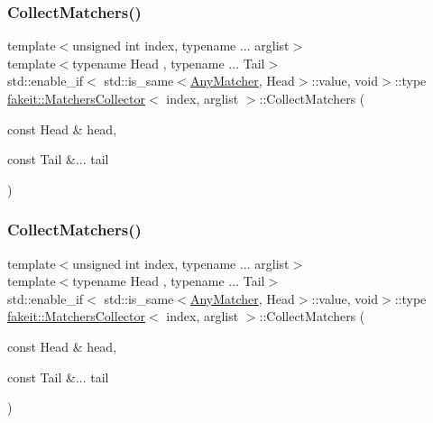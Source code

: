 \mbox{\label{classfakeit_1_1MatchersCollector_a5bc97a3d729b1bb67e372181ad88b77d}} 
\subsubsection{\texorpdfstring{CollectMatchers()}{CollectMatchers()}\hspace{0.1cm}{\footnotesize\ttfamily [51/63]}}
{\footnotesize\ttfamily template$<$unsigned int index, typename ... arglist$>$ \\
template$<$typename Head , typename ... Tail$>$ \\
std\+::enable\+\_\+if$<$ std\+::is\+\_\+same$<$\mbox{\hyperlink{structfakeit_1_1AnyMatcher}{Any\+Matcher}}, Head$>$\+::value, void$>$\+::type \mbox{\hyperlink{classfakeit_1_1MatchersCollector}{fakeit\+::\+Matchers\+Collector}}$<$ index, arglist $>$\+::Collect\+Matchers (\begin{DoxyParamCaption}\item[{const Head \&}]{head,  }\item[{const Tail \&...}]{tail }\end{DoxyParamCaption})\hspace{0.3cm}{\ttfamily [inline]}}

\mbox{\label{classfakeit_1_1MatchersCollector_a5bc97a3d729b1bb67e372181ad88b77d}} 
\subsubsection{\texorpdfstring{CollectMatchers()}{CollectMatchers()}\hspace{0.1cm}{\footnotesize\ttfamily [52/63]}}
{\footnotesize\ttfamily template$<$unsigned int index, typename ... arglist$>$ \\
template$<$typename Head , typename ... Tail$>$ \\
std\+::enable\+\_\+if$<$ std\+::is\+\_\+same$<$\mbox{\hyperlink{structfakeit_1_1AnyMatcher}{Any\+Matcher}}, Head$>$\+::value, void$>$\+::type \mbox{\hyperlink{classfakeit_1_1MatchersCollector}{fakeit\+::\+Matchers\+Collector}}$<$ index, arglist $>$\+::Collect\+Matchers (\begin{DoxyParamCaption}\item[{const Head \&}]{head,  }\item[{const Tail \&...}]{tail }\end{DoxyParamCaption})\hspace{0.3cm}{\ttfamily [inline]}}

